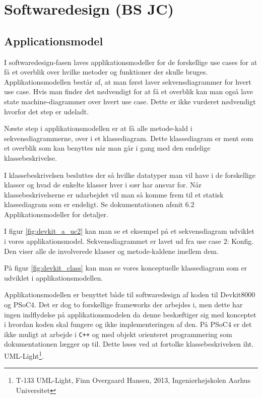 \section{Softwaredesign (BS JC)}

\subsection{Applicationsmodel}
I softwaredesign-fasen laves applikationsmodeller for de forskellige use cases for at få et overblik over hvilke metoder og funktioner der skulle bruges. Applikationsmodellen består af, at man først laver sekvensdiagrammer for hvert use case. Hvis man finder det nødvendigt for at få et overblik kan man også lave state machine-diagrammer over hvert use case. Dette er ikke vurderet nødvendigt hvorfor det step er udeladt.

Næste step i applikationsmodellen er at få alle metode-kald i sekvensdiagrammerne, over i et klassediagram. Dette klassediagram er ment som et overblik som kan benyttes når man går i gang med den endelige klassebeskrivelse.

I klassebeskrivelsen besluttes der så hvilke datatyper man vil have i de forskellige klasser og hvad de enkelte klasser hver i sær har ansvar for. Når klassebeskrivelserne er udarbejdet vil man så komme frem til et statisk klassediagram som er endeligt. Se dokumentationen afsnit 6.2 Applikationsmodeller for detaljer.


I figur \ref{fig:devkit_a_uc2} kan man se et eksempel på et sekvensdiagram udviklet i vores applikationsmodel. Sekvensdiagrammet er lavet ud fra use case 2: Konfig. Den viser alle de involverede klasser og metode-kaldene imellem dem.

På figur \ref{fig:devkit_class} kan man se vores konceptuelle klassediagram som er udviklet i applikationsmodellen.


Applikationsmodellen er benyttet både til softwaredesign af koden til Devkit8000 og PSoC4. Det er dog to forskellige frameworks der arbejdes i, men dette har ingen indflydelse på applikationsmodelen da denne beskæftiger sig med konceptet i hvordan koden skal fungere og ikke implementeringen af den. På PSoC4 er det ikke muligt at arbejde i \verb-C++- og med objekt orienteret programmering som dokumentationen lægger op til. Dette løses ved at fortolke klassebeskrivelsen iht. UML-Light\footnote{T-133 UML-Light, Finn Overgaard Hansen, 2013, Ingeniørhøjskolen Aarhus Universitet}.

